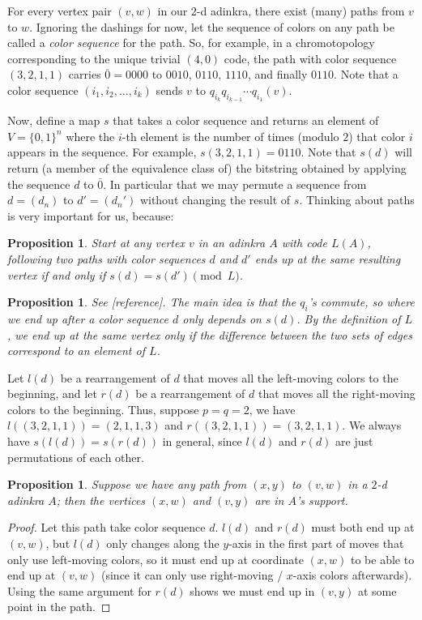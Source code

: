 \documentclass[12pt,twoside,singlespace]{article}
\numberwithin{equation}{section}
\newtheorem{prop}[equation]{Proposition}
\theoremstyle{definition}
\begin{document}
For every vertex pair $(v,w)$ in our $2$-d adinkra, there exist (many) paths from $v$ to $w$. Ignoring the dashings for now, let the sequence of colors on any path be called a \emph{color sequence} for the path. So, for example, in a chromotopology corresponding to the unique trivial $(4,0)$ code, the path with color sequence $(3,2,1,1)$ carries $\overline{0} = 0000$ to $0010$, $0110$, $1110$, and finally $0110$. Note that a color sequence $(i_1, i_2, \ldots, i_k)$ sends $v$ to $q_{i_k} q_{i_{k-1}} \cdots q_{i_1} (v)$.

Now, define a map $s$ that takes a color sequence and returns an element of $V = \{0,1\}^n$ where the $i$-th element is the number of times (modulo $2$) that color $i$ appears in the sequence. For example, $s(3,2,1,1) = 0110$. Note that $s(d)$ will return (a member of the equivalence class of) the bitstring obtained by applying the sequence $d$ to $\overline{0}$.  In particular that we may permute a sequence from $d = (d_n)$ to $d' = (d_n')$ without changing the result of $s$. Thinking about paths is very important for us, because:

\begin{prop}
\label{prop:paths}
Start at any vertex $v$ in an adinkra $A$ with code $L(A)$, following two paths with color sequences $d$ and $d'$ ends up at the same resulting vertex if and only if $s(d) = s(d') \pmod{L}$.
\end{prop}
\begin{prop}
See [reference]. The main idea is that the $q_i$'s commute, so where we end up after a color sequence $d$ only depends on $s(d)$. By the definition of $L$, we end up at the same vertex only if the difference between the two sets of edges correspond to an element of $L$.
\end{prop}

Let $l(d)$ be a rearrangement of $d$ that moves all the left-moving colors to the beginning, and let $r(d)$ be a rearrangement of $d$ that moves all the right-moving colors to the beginning. Thus, suppose $p = q = 2$, we have $l((3,2,1,1)) = (2,1,1,3)$ and $r((3,2,1,1)) = (3,2,1,1)$. We always have $s(l(d)) = s(r(d))$ in general, since $l(d)$ and $r(d)$ are just permutations of each other.

\begin{prop}
\label{prop:rectangle-completion}
Suppose we have any path from $(x,y)$ to $(v,w)$ in a $2$-d adinkra $A$; then the vertices $(x,w)$ and $(v,y)$ are in $A$'s support.
\end{prop}
\begin{proof}
Let this path take color sequence $d$. $l(d)$ and $r(d)$ must both end up at $(v,w)$, but $l(d)$ only changes along the $y$-axis in the first part of moves that only use left-moving colors, so it must end up at coordinate $(x,w)$ to be able to end up at $(v,w)$ (since it can only use right-moving / $x$-axis colors afterwards). Using the same argument for $r(d)$ shows we must end up in $(v,y)$ at some point in the path.
\end{proof}
\end{document}
